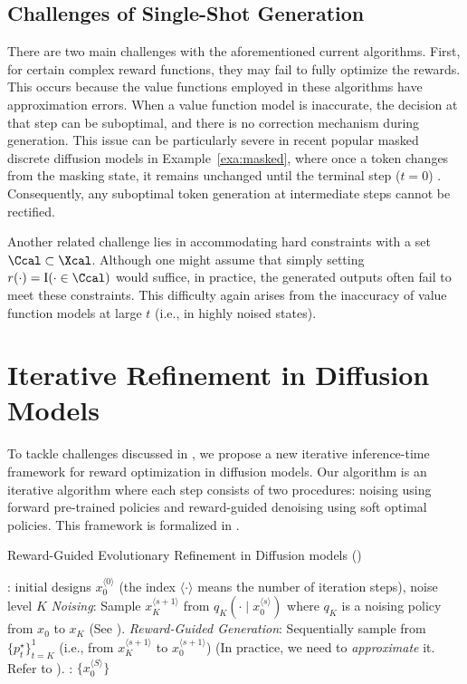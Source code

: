 
\subsection{Challenges of Single-Shot Generation}\label{sec:challenge}

There are two main challenges with the aforementioned current algorithms. First, for certain complex reward functions, they may fail to fully optimize the rewards. This occurs because the value functions employed in these algorithms have approximation errors. When a value function model is inaccurate, the decision at that step can be suboptimal, and there is no correction mechanism during generation. This issue can be particularly severe in recent popular masked discrete diffusion models in Example~\ref{exa:masked}, where once a token changes from the masking state, it remains unchanged until the terminal step ($t=0$) \citep{sahoo2024simple,shi2024simplified}. Consequently, any suboptimal token generation at intermediate steps cannot be rectified.

Another related challenge lies in accommodating hard constraints with a set $\Ccal \subset \Xcal$. Although one might assume that simply setting $r(\cdot)=\mathrm{I}(\cdot \in \Ccal)$ would suffice, in practice, the generated outputs often fail to meet these constraints. This difficulty again arises from the inaccuracy of value function models at large $t$ (i.e., in highly noised states).


\section{Iterative Refinement in Diffusion Models}\label{sec:iterative}



To tackle challenges discussed in , we propose a new iterative inference-time framework for reward optimization in diffusion models. Our algorithm is an iterative algorithm where each step consists of two procedures: noising using forward pre-trained policies and reward-guided denoising using soft optimal policies. This framework is formalized in .  

\begin{algorithm}[!th]
\caption{Reward-Guided Evolutionary Refinement in Diffusion models (\alg)}\label{alg:decoding}
\begin{algorithmic}[1]
     : %
     initial designs $x^{\langle 0 \rangle }_0$ (the index $\langle \cdot \rangle $ means the number of iteration steps), noise level $K$ 
       \STATE  \emph{Noising}: Sample $x^{\langle s+1 \rangle }_K$ from  $q_K(\cdot \mid x^{\langle s \rangle }_0)$ where $q_K$ is a noising policy from $x_0$ to $x_K$ (See ). 
        \STATE \emph{Reward-Guided Generation}: Sequentially sample from $\{p^{\star}_{t}\}_{t=K}^1$ (i.e., from $x^{\langle s+1 \rangle }_K$ to $x^{\langle s+1 \rangle }_0$) (In practice, we need to \emph{approximate} it. Refer to ). 
     \ENDFOR 
  : $\{ x^{\langle S \rangle}_0\}$
\end{algorithmic}
\end{algorithm} 

